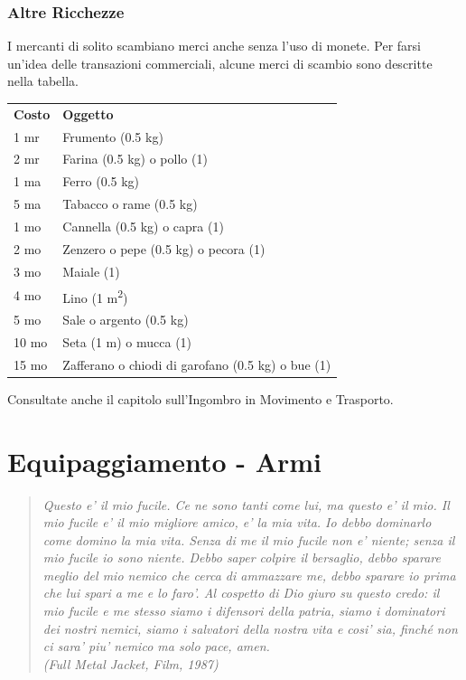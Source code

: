 \documentclass[a4paper,11pt,twoside,openany]{book}
\begin{document}
{		\bigskip
		
		\subsubsection{Altre Ricchezze}
		
		I mercanti di solito scambiano merci anche senza l'uso di monete.
		Per farsi un'idea delle transazioni commerciali, alcune merci di scambio sono descritte nella tabella.
		
		\bigskip
		
		\begin{tabular}{ll}
			\toprule
			\textbf{Costo} & \textbf{Oggetto}\tabularnewline
			1 mr & Frumento (0.5 kg)\tabularnewline
			2 mr & Farina (0.5 kg) o pollo (1)\tabularnewline
			1 ma & Ferro (0.5 kg)\tabularnewline
			5 ma & Tabacco o rame (0.5 kg)\tabularnewline
			1 mo & Cannella (0.5 kg) o capra (1)\tabularnewline
			2 mo & Zenzero o pepe (0.5 kg) o pecora (1)\tabularnewline
			3 mo & Maiale (1)\tabularnewline
			4 mo & Lino (1 m\textsuperscript{2})\tabularnewline
			5 mo & Sale o argento (0.5 kg)\tabularnewline
			10 mo & Seta (1 m) o mucca (1)\tabularnewline
			15 mo & Zafferano o chiodi di garofano (0.5 kg) o bue (1)\tabularnewline
		\end{tabular}
		
		Consultate anche il capitolo sull'Ingombro in Movimento e Trasporto.
		
		\pagebreak
		
		\section{Equipaggiamento - Armi}
		
		\label{equipaggiamento---armi}
		\begin{quote}\textit{
				Questo e' il mio fucile. Ce ne sono tanti come lui, ma questo e' il mio. Il mio fucile e' il mio migliore amico, e' la mia vita. Io debbo dominarlo come domino la mia vita. Senza di me il mio fucile non e' niente; senza il mio fucile io sono niente. Debbo saper colpire il bersaglio, debbo sparare meglio del mio nemico che cerca di ammazzare me, debbo sparare io prima che lui spari a me e lo faro'. Al cospetto di Dio giuro su questo credo: il mio fucile e me stesso siamo i difensori della patria, siamo i dominatori dei nostri nemici, siamo i salvatori della nostra vita e cosi' sia, finché non ci sara' piu' nemico ma solo pace, amen.
				\\
				(Full Metal Jacket, Film, 1987)
		}\end{quote}
		
}
\end{document}
